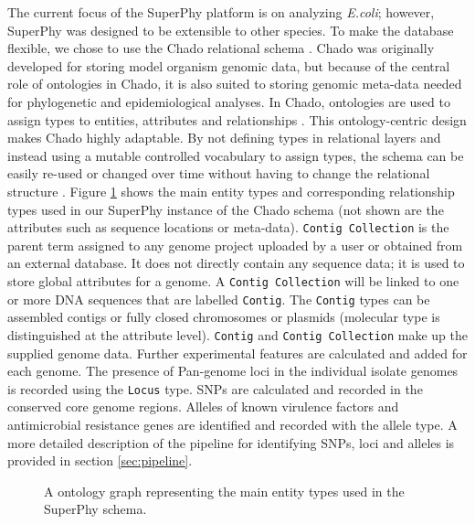 \documentclass[a4paper,twoside]{article}
\begin{document}
The current focus of the SuperPhy platform is on analyzing \textit{E.coli}; however, SuperPhy was designed to be extensible to other species. To make the database flexible, we chose to use the Chado relational schema \cite{mungall2007chado}. Chado was originally developed for storing model organism genomic data, but because of the central role of ontologies in Chado, it is also suited to storing genomic meta-data needed for phylogenetic and epidemiological analyses. In Chado, ontologies are used to assign types to entities, attributes and relationships \cite{mungall2007chado}. This ontology-centric design makes Chado highly adaptable. By not defining types in relational layers and instead using a mutable controlled vocabulary to assign types, the schema can be easily re-used or changed over time without having to change the relational structure \cite{mungall2007chado}.  Figure \ref{fig:ontology} shows the main entity types and corresponding relationship types used in our SuperPhy instance of the Chado schema (not shown are the attributes such as sequence locations or  meta-data). \texttt{Contig Collection} is the parent term assigned to any genome project uploaded by a user or obtained from an external database.  It does not directly contain any sequence data; it is used to store global attributes for a genome. A \texttt{Contig Collection} will be linked to one or more DNA sequences that are labelled \texttt{Contig}. The \texttt{Contig} types can be assembled contigs or fully closed chromosomes or plasmids (molecular type is distinguished at the attribute level). \texttt{Contig} and \texttt{Contig Collection} make up the supplied genome data. Further experimental features are calculated and added for each genome. The presence of Pan-genome loci in the individual isolate genomes is recorded using the \texttt{Locus} type. SNPs are calculated and recorded in the conserved core genome regions. Alleles of known virulence factors and antimicrobial resistance genes are identified and recorded with the allele type.  A more detailed description of the pipeline for identifying SNPs, loci and alleles is provided in section \ref{sec:pipeline}.

\begin{figure}[t]
  \vspace{-0.2cm}
  \centering
   {}
  \caption{A ontology graph representing the main entity types used in the SuperPhy schema.}
  \label{fig:ontology}
\end{figure}
\end{document}

